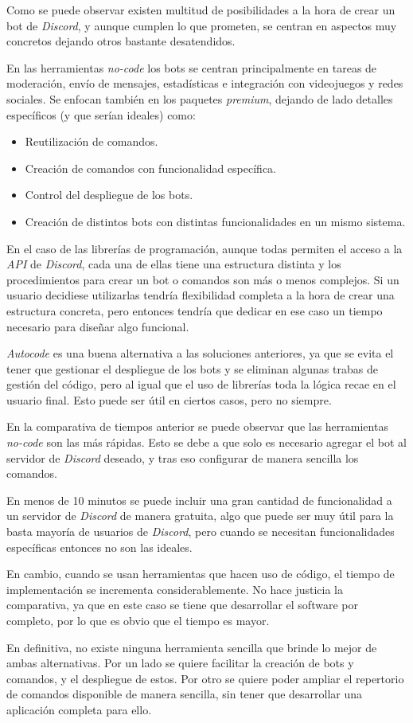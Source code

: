 Como se puede observar existen multitud de posibilidades a la hora de crear un bot de \textit{Discord}, y aunque cumplen lo que prometen, se centran en aspectos muy concretos dejando otros bastante desatendidos.

En las herramientas \textit{no-code} los bots se centran principalmente en tareas de moderación, envío de mensajes, estadísticas e integración con videojuegos y redes sociales. Se enfocan también en los paquetes \textit{premium}, dejando de lado detalles específicos (y que serían ideales) como:

\begin{itemize}
	\item Reutilización de comandos.
	\item Creación de comandos con funcionalidad específica.
	\item Control del despliegue de los bots.
	\item Creación de distintos bots con distintas funcionalidades en un mismo sistema.
\end{itemize}

En el caso de las librerías de programación, aunque todas permiten el acceso a la \textit{API} de \textit{Discord}, cada una de ellas tiene una estructura distinta y los procedimientos para crear un bot o comandos son más o menos complejos. Si un usuario decidiese utilizarlas tendría flexibilidad completa a la hora de crear una estructura concreta, pero entonces tendría que dedicar en ese caso un tiempo necesario para diseñar algo funcional.

\textit{Autocode} es una buena alternativa a las soluciones anteriores, ya que se evita el tener que gestionar el despliegue de los bots y se eliminan algunas trabas de gestión del código, pero al igual que el uso de librerías toda la lógica recae en el usuario final. Esto puede ser útil en ciertos casos, pero no siempre.

En la comparativa de tiempos anterior se puede observar que las herramientas \textit{no-code} son las más rápidas. Esto se debe a que solo es necesario agregar el bot al servidor de \textit{Discord} deseado, y tras eso configurar de manera sencilla los comandos.

En menos de 10 minutos se puede incluir una gran cantidad de funcionalidad a un servidor de \textit{Discord} de manera gratuita, algo que puede ser muy útil para la basta mayoría de usuarios de \textit{Discord}, pero cuando se necesitan funcionalidades específicas entonces no son las ideales.

En cambio, cuando se usan herramientas que hacen uso de código, el tiempo de implementación se incrementa considerablemente. No hace justicia la comparativa, ya que en este caso se tiene que desarrollar el software por completo, por lo que es obvio que el tiempo es mayor.

En definitiva, no existe ninguna herramienta sencilla que brinde lo mejor de ambas alternativas. Por un lado se quiere facilitar la creación de bots y comandos, y el despliegue de estos. Por otro se quiere poder ampliar el repertorio de comandos disponible de manera sencilla, sin tener que desarrollar una aplicación completa para ello.
